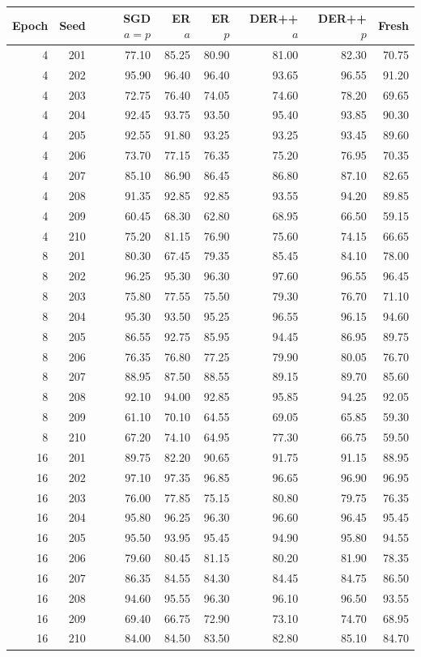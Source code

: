 \begin{tabular}{rrrrrrrr}
\toprule
Epoch & Seed & SGD $a=p$ & ER $a$ & ER $p$ & DER++ $a$ & DER++ $p$ & Fresh \\
\midrule
4 & 201 & 77.10 & 85.25 & 80.90 & 81.00 & 82.30 & 70.75 \\
4 & 202 & 95.90 & 96.40 & 96.40 & 93.65 & 96.55 & 91.20 \\
4 & 203 & 72.75 & 76.40 & 74.05 & 74.60 & 78.20 & 69.65 \\
4 & 204 & 92.45 & 93.75 & 93.50 & 95.40 & 93.85 & 90.30 \\
4 & 205 & 92.55 & 91.80 & 93.25 & 93.25 & 93.45 & 89.60 \\
4 & 206 & 73.70 & 77.15 & 76.35 & 75.20 & 76.95 & 70.35 \\
4 & 207 & 85.10 & 86.90 & 86.45 & 86.80 & 87.10 & 82.65 \\
4 & 208 & 91.35 & 92.85 & 92.85 & 93.55 & 94.20 & 89.85 \\
4 & 209 & 60.45 & 68.30 & 62.80 & 68.95 & 66.50 & 59.15 \\
4 & 210 & 75.20 & 81.15 & 76.90 & 75.60 & 74.15 & 66.65 \\
8 & 201 & 80.30 & 67.45 & 79.35 & 85.45 & 84.10 & 78.00 \\
8 & 202 & 96.25 & 95.30 & 96.30 & 97.60 & 96.55 & 96.45 \\
8 & 203 & 75.80 & 77.55 & 75.50 & 79.30 & 76.70 & 71.10 \\
8 & 204 & 95.30 & 93.50 & 95.25 & 96.55 & 96.15 & 94.60 \\
8 & 205 & 86.55 & 92.75 & 85.95 & 94.45 & 86.95 & 89.75 \\
8 & 206 & 76.35 & 76.80 & 77.25 & 79.90 & 80.05 & 76.70 \\
8 & 207 & 88.95 & 87.50 & 88.55 & 89.15 & 89.70 & 85.60 \\
8 & 208 & 92.10 & 94.00 & 92.85 & 95.85 & 94.25 & 92.05 \\
8 & 209 & 61.10 & 70.10 & 64.55 & 69.05 & 65.85 & 59.30 \\
8 & 210 & 67.20 & 74.10 & 64.95 & 77.30 & 66.75 & 59.50 \\
16 & 201 & 89.75 & 82.20 & 90.65 & 91.75 & 91.15 & 88.95 \\
16 & 202 & 97.10 & 97.35 & 96.85 & 96.65 & 96.90 & 96.95 \\
16 & 203 & 76.00 & 77.85 & 75.15 & 80.80 & 79.75 & 76.35 \\
16 & 204 & 95.80 & 96.25 & 96.30 & 96.60 & 96.45 & 95.45 \\
16 & 205 & 95.50 & 93.95 & 95.45 & 94.90 & 95.80 & 94.55 \\
16 & 206 & 79.60 & 80.45 & 81.15 & 80.20 & 81.90 & 78.35 \\
16 & 207 & 86.35 & 84.55 & 84.30 & 84.45 & 84.75 & 86.50 \\
16 & 208 & 94.60 & 95.55 & 96.30 & 96.10 & 96.50 & 93.55 \\
16 & 209 & 69.40 & 66.75 & 72.90 & 73.10 & 74.70 & 68.95 \\
16 & 210 & 84.00 & 84.50 & 83.50 & 82.80 & 85.10 & 84.70 \\
\bottomrule
\end{tabular}
